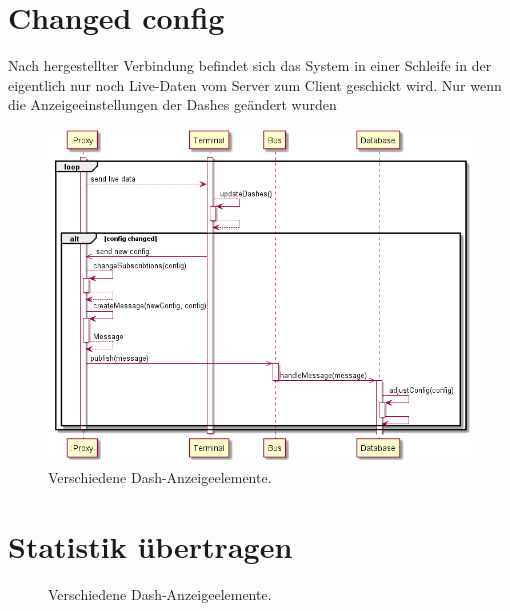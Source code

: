 \documentclass[entwurf.tex]{subfiles}
\begin{document}
  	\section{Changed config}
  		Nach hergestellter Verbindung befindet sich das System in einer Schleife in der eigentlich nur noch Live-Daten vom Server zum Client geschickt wird. Nur wenn die Anzeigeeinstellungen der Dashes geändert wurden 
  		\begin{figure}[H]
  			\begin{center}
 				\includegraphics[width=\textwidth]{diagrams/ChangeDashConfig.png}
  				\caption{Verschiedene Dash-Anzeigeelemente.}
  			\end{center}
  		\end{figure}
  		
  	\section{Statistik übertragen}
  		
  		\begin{figure}[H]
  			\caption{Verschiedene Dash-Anzeigeelemente.}
  		\end{figure}
  		
  	
\end{document}
